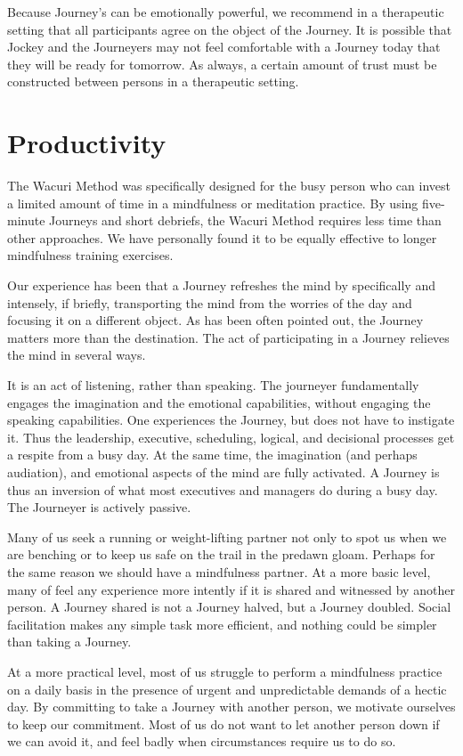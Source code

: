 \documentclass[12pt]{book}
\begin{document}
Because Journey's can be emotionally powerful, we recommend in a
therapeutic setting that all participants agree on the object of the
Journey. It is possible that Jockey and the Journeyers may not feel
comfortable with a Journey today that they will be ready for
tomorrow. As always, a certain amount of trust must be constructed
between persons in a therapeutic setting.

\section{Productivity}

The Wacuri Method was specifically designed for the busy person who
can invest a limited amount of time in a mindfulness or meditation
practice. By using five-minute Journeys and short debriefs, the Wacuri
Method requires less time than other approaches. We have personally
found it to be equally effective to longer mindfulness training
exercises.

Our experience has been that a Journey refreshes the mind by
specifically and intensely, if briefly, transporting the mind from the
worries of the day and focusing it on a different object. As has been
often pointed out, the Journey matters more than the destination. The
act of participating in a Journey relieves the mind in several ways.

It is an act of listening, rather than speaking. The journeyer
fundamentally engages the imagination and the emotional capabilities,
without engaging the speaking capabilities. One experiences the
Journey, but does not have to instigate it.  Thus the leadership,
executive, scheduling, logical, and decisional processes get a respite
from a busy day. At the same time, the imagination (and perhaps
audiation), and emotional aspects of the mind are fully activated. A
Journey is thus an inversion of what most executives and managers do
during a busy day. The Journeyer is actively passive.

Many of us seek a running or weight-lifting partner not only to spot
us when we are benching or to keep us safe on the trail in the
predawn gloam.  Perhaps for the same reason we should have a
mindfulness partner.  At a more basic level, many of feel any
experience more intently if it is shared and witnessed by another
person. A Journey shared is not a Journey halved, but a Journey
doubled.  Social facilitation makes any simple task more efficient, and
nothing could be simpler than taking a Journey.

At a more practical level, most of us struggle to perform a
mindfulness practice on a daily basis in the presence of urgent and
unpredictable demands of a hectic day.  By committing to take a Journey
with another person, we motivate ourselves to keep our commitment. Most
of us do not want to let another person down if we can avoid it, and
feel badly when circumstances require us to do so.
\end{document}
